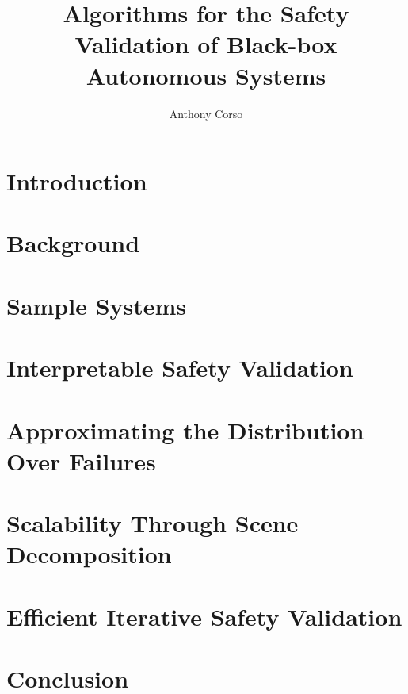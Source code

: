 \documentclass[12pt,letterpaper]{report}
\title{Algorithms for the Safety Validation of Black-box Autonomous Systems}
\author{Anthony Corso}
\begin{document}
\beforepreface






\afterpreface

\chapter{Introduction}


\chapter{Background}


\chapter{Sample Systems}


\chapter{Interpretable Safety Validation}


\chapter{Approximating the Distribution Over Failures}


\chapter{Scalability Through Scene Decomposition}


\chapter{Efficient Iterative Safety Validation}


\chapter{Conclusion}


\printbibliography
\end{document}

